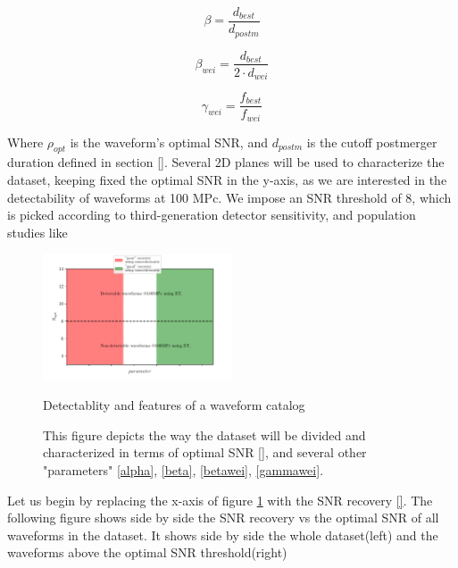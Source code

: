 \begin{equation}\label{beta}
\beta = \frac{d_{best}}{d_{postm}}
\end{equation}

\begin{equation}\label{betawei}
\beta_{wei} = \frac{d_{best}}{2\cdot d_{wei}}
\end{equation}

\begin{equation}\label{gammawei}
\gamma_{wei} = \frac{f_{best}}{f_{wei}}
\end{equation}

Where $\rho_{opt}$ is the waveform's optimal SNR, and $d_{postm}$ is the cutoff postmerger duration defined in section \ref{}. Several 2D planes will be used to characterize the dataset, keeping fixed the optimal SNR in the y-axis, as we are interested in the detectability of waveforms at 100 MPc. We impose an SNR  threshold of 8, which is picked according to third-generation detector sensitivity, and population studies like \cite[section 3]{https://doi.org/10.48550/arxiv.2109.09882}


\begin{figure}[hbt!]
\begin{center}
\includegraphics[width=0.5\textwidth, angle=0]{images/Data_analysis/results/schematics.pdf}
\captionsetup{width=0.8\textwidth}
\caption{Detectablity and features of a waveform catalog}
\caption*{This figure depicts the way the dataset will be divided and characterized in terms of optimal SNR \ref{}, and several other "parameters" \ref{alpha}, \ref{beta}, \ref{betawei}, \ref{gammawei}.}
\label{regions}
\end{center} 
\end{figure}

\FloatBarrier

Let us begin by replacing the x-axis of figure \ref{regions} with the SNR recovery \ref{}. The following figure shows side by side the SNR recovery vs the optimal SNR of all waveforms in the dataset. It shows side by side the whole dataset(left) and the waveforms above the optimal SNR threshold(right)


